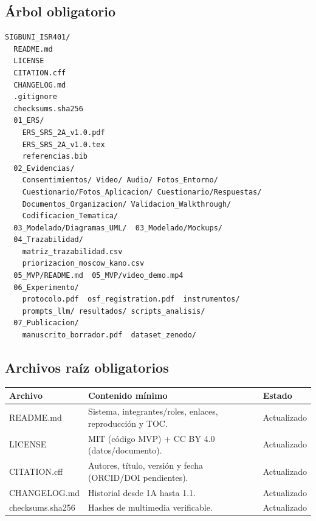 \documentclass[12pt,journal,onecolumn]{IEEEtran}
\begin{document}
\subsection{Árbol obligatorio}
\begin{Verbatim}[fontsize=\small]
SIGBUNI_ISR401/
  README.md
  LICENSE
  CITATION.cff
  CHANGELOG.md
  .gitignore
  checksums.sha256
  01_ERS/
    ERS_SRS_2A_v1.0.pdf
    ERS_SRS_2A_v1.0.tex
    referencias.bib
  02_Evidencias/
    Consentimientos/ Video/ Audio/ Fotos_Entorno/
    Cuestionario/Fotos_Aplicacion/ Cuestionario/Respuestas/
    Documentos_Organizacion/ Validacion_Walkthrough/
    Codificacion_Tematica/
  03_Modelado/Diagramas_UML/  03_Modelado/Mockups/
  04_Trazabilidad/
    matriz_trazabilidad.csv
    priorizacion_moscow_kano.csv
  05_MVP/README.md  05_MVP/video_demo.mp4
  06_Experimento/
    protocolo.pdf  osf_registration.pdf  instrumentos/
    prompts_llm/ resultados/ scripts_analisis/
  07_Publicacion/
    manuscrito_borrador.pdf  dataset_zenodo/
\end{Verbatim}

\subsection{Archivos raíz obligatorios}
\begin{tabularx}{\textwidth}{P{0.22\textwidth}Y P{0.14\textwidth}}\toprule
\textbf{Archivo} & \textbf{Contenido mínimo} & \textbf{Estado}\\\midrule
README.md & Sistema, integrantes/roles, enlaces, reproducción y TOC. & Actualizado\\
LICENSE & MIT (código MVP) + CC BY 4.0 (datos/documento). & Actualizado\\
CITATION.cff & Autores, título, versión y fecha (ORCID/DOI pendientes). & Actualizado\\
CHANGELOG.md & Historial desde 1A hasta 1.1. & Actualizado\\
checksums.sha256 & Hashes de multimedia verificable. & Actualizado\\\bottomrule
\end{tabularx}
\end{document}
